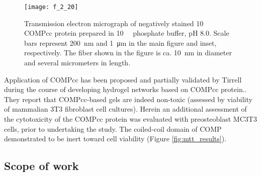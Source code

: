 \begin{refsection}
\begin{figure}[h!] \centering \texttt{[image: f\_2\_20]}
    \caption[Transmission electron micrograph of negatively stained
    \SI{10}{\micro\moLar} COMPcc protein prepared in
\SI{10}{\milli\moLar} phosphate buffer, pH 8.0. Scale bars represent
\SI{200}{\nm} and \SI{1}{\um} in the main figure and inset, respectively. The
fiber shown in the figure is ca. \SI{10}{\nm} in diameter and several
micrometers in length.]{Transmission electron micrograph of negatively stained
    \SI{10}{\micro\moLar} COMPcc protein prepared in
\SI{10}{\milli\moLar} phosphate buffer, pH 8.0. Scale bars represent
\SI{200}{\nm} and \SI{1}{\um} in the main figure and inset, respectively. The
fiber shown in the figure is ca. \SI{10}{\nm} in diameter and several
micrometers in length.\cite{Gunasekar2012}}\label{fig:COMP_EM_2} \end{figure}

Application of COMPcc has been proposed and partially validated by Tirrell
 during the course of developing hydrogel networks based on COMPcc
protein.\cite{Shen2006a}. They report that COMPcc-based gels
are indeed non-toxic (assessed by viability of mammalian 3T3 fibroblast cell
cultures). Herein an additional assessment of the cytotoxicity of the COMPcc
protein was evaluated with preosteoblast MC3T3 cells, prior to undertaking the
study. The coiled-coil domain of COMP demonstrated to be inert toward cell
viability (Figure \ref{fig:mtt_results}).

\subsection{Scope of work}



\end{refsection}
